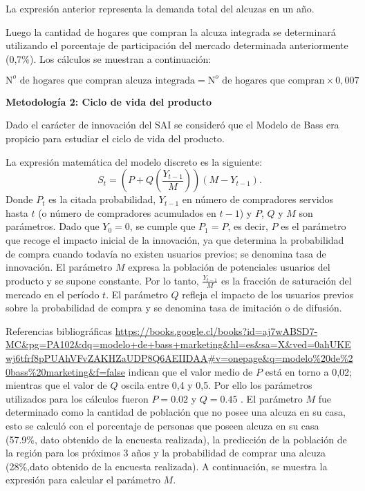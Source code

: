 La expresión anterior representa la demanda total del alcuzas en un año.

Luego la cantidad de hogares que compran la alcuza integrada se determinará utilizando el porcentaje de participación del mercado determinada anteriormente (0,7\%). Los cálculos se muestran a continuación:

\begin{equation*}
\mbox{N}^o\mbox{ de hogares que compran alcuza integrada} = \mbox{N}^o\mbox{ de hogares que compran}\times 0,007
\end{equation*}

\textbf{Metodología 2:  Ciclo de vida del producto}

Dado el carácter de innovación del SAI se consideró que el Modelo de Bass era propicio para estudiar el ciclo de vida del producto.

La expresión matemática del modelo discreto es la siguiente:
\begin{equation*}
S_t=(P+Q(\frac{Y_{t-1}}{M}))(M-Y_{t-1}).
\end{equation*}
Donde $P_t$ es la citada probabilidad, $Y_{t-1} $ en número de compradores servidos hasta $t$ (o número de compradores acumulados en $t-1$) y $P$, $Q$ y $M$ son parámetros. Dado que $Y_0=0$, se cumple que $P_1=P$, es decir, $P$ es el parámetro que recoge el impacto inicial de la innovación, ya que determina la probabilidad de compra cuando todavía no existen usuarios previos; se denomina tasa de innovación. El parámetro $M$ expresa la población de potenciales usuarios del producto y se supone constante. Por lo tanto, $\frac{Y_{t-1}}{M}$ es la fracción de saturación del mercado en el período $t$. El parámetro $Q$ refleja el impacto de los usuarios previos sobre la probabilidad de compra y se denomina tasa de imitación o de difusión.


Referencias bibliográficas \url{https://books.google.cl/books?id=aj7wABSD7-MC&pg=PA102&dq=modelo+de+bass+marketing&hl=es&sa=X&ved=0ahUKEwj6tfrf8pPUAhVFvZAKHZaUDP8Q6AEIIDAA#v=onepage&q=modelo%20de%20bass%20marketing&f=false} indican que el valor medio de $P$ está en torno a 0,02; mientras que el valor de $Q$ oscila entre 0,4 y 0,5. Por ello los parámetros utilizados para los cálculos fueron $P=0.02$ y $Q=0.45$ . El parámetro $M$ fue determinado como la cantidad de población que no posee una alcuza en su casa, esto se calculó con el porcentaje de personas que poseen alcuza en su casa (57.9\%, dato obtenido de la encuesta realizada), la predicción de la población de la región para los próximos 3 años y la probabilidad de comprar una alcuza (28\%,dato obtenido de la encuesta realizada). A continuación, se muestra la expresión para calcular el parámetro $M$.

